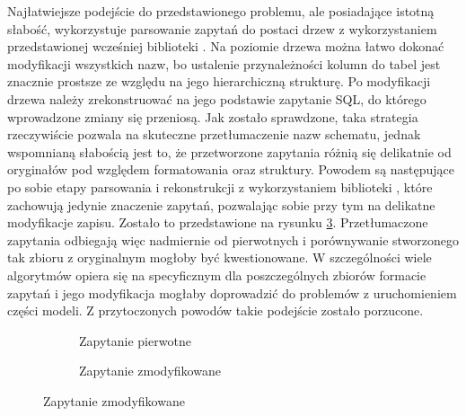 Najłatwiejsze podejście do przedstawionego problemu, ale posiadające istotną słabość, wykorzystuje parsowanie zapytań do postaci drzew  z wykorzystaniem przedstawionej wcześniej biblioteki . Na poziomie drzewa można łatwo dokonać modyfikacji wszystkich nazw, bo ustalenie przynależności kolumn do tabel jest znacznie prostsze ze względu na jego hierarchiczną strukturę. Po modyfikacji drzewa należy zrekonstruować na jego podstawie zapytanie SQL, do którego wprowadzone zmiany się przeniosą. Jak zostało sprawdzone, taka strategia rzeczywiście pozwala na skuteczne przetłumaczenie nazw schematu, jednak wspomnianą słabością jest to, że przetworzone zapytania różnią się delikatnie od oryginałów pod względem formatowania oraz struktury. Powodem są następujące po sobie etapy parsowania i rekonstrukcji z wykorzystaniem biblioteki , które zachowują jedynie znaczenie zapytań, pozwalając sobie przy tym na delikatne modyfikacje zapisu. Zostało to przedstawione na rysunku \ref{fig:sqlglot-translation}. Przetłumaczone zapytania odbiegają więc nadmiernie od pierwotnych i porównywanie stworzonego tak zbioru z oryginalnym mogłoby być kwestionowane. W szczególności wiele algorytmów opiera się na specyficznym dla poszczególnych zbiorów formacie zapytań i jego modyfikacja mogłaby doprowadzić do problemów z uruchomieniem części modeli. Z przytoczonych powodów takie podejście zostało porzucone.

\begin{figure}[ht!]
\centering
\begin{subfigure}{0.48\textwidth}
    \begin{minipage}{\linewidth}
        
    \end{minipage}
    \caption{Zapytanie pierwotne}
    \label{fig:sqlglot-before}
\end{subfigure}
\hfill
\begin{subfigure}{0.48\textwidth}
    \begin{minipage}{\linewidth}
        
    \end{minipage}
    \caption{Zapytanie zmodyfikowane}
    \label{fig:sqlglot-after}
\end{subfigure}
\label{fig:sqlglot-translation}
\end{figure}

